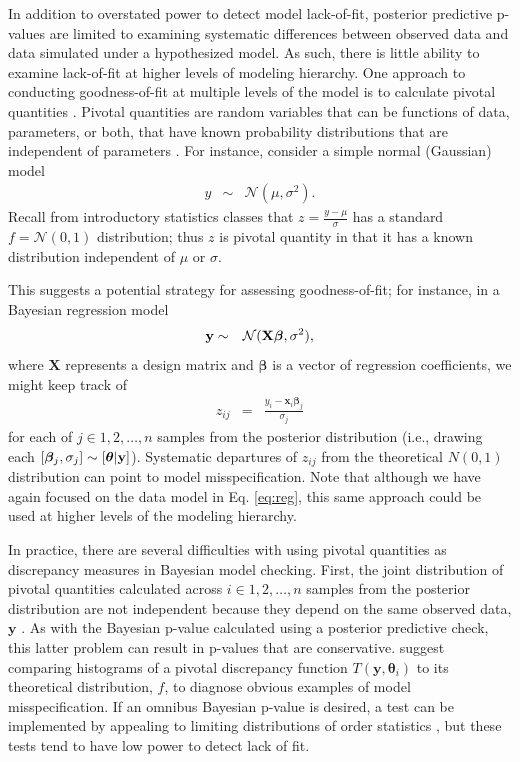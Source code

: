 \documentclass[12pt,english]{article}
\begin{document}
\begin{spacing}{1.9}
In addition to overstated power to detect model lack-of-fit, posterior predictive p-values are limited to examining systematic differences between observed data and data simulated under a hypothesized model.  As such, there is little ability to examine lack-of-fit at higher levels of modeling hierarchy.  One approach to conducting goodness-of-fit at multiple levels of the model is to calculate pivotal quantities \citep{Johnson2004,YuanJohnson2012}.  Pivotal quantities are random variables that can be functions of data, parameters, or both, that have known probability distributions that are independent of parameters \citep[see e.g.,][section 9.2.2]{CasellaBerger1990}.  For instance, consider a simple normal (Gaussian) model
\begin{eqnarray*}
  y & \sim & \mathcal{N}(\mu,\sigma^2).
\end{eqnarray*}
Recall from introductory statistics classes that $z = \frac{y-\mu}{\sigma}$ has a standard $f=\mathcal{N}(0,1)$ distribution; thus $z$ is pivotal quantity in that it has a known distribution independent of $\mu$ or $\sigma$.

This suggests a potential strategy for assessing goodness-of-fit; for instance, in a Bayesian regression model
\begin{eqnarray}
  \label{eq:reg}
  {\bf y} & \sim & \mathcal{N}(\textbf{X} \boldsymbol{\beta},\sigma^2),
\end{eqnarray}
where $\textbf{X}$ represents a design matrix and $\boldsymbol{\beta}$ is a vector of regression coefficients, we might keep track of
\begin{eqnarray}
  \label{eq:resid}
  z_{ij} & = & \frac{y_i - \textbf{x}_i \boldsymbol{\beta}_j}{\sigma_j}
\end{eqnarray}
for each of $j \in {1, 2, \hdots, n}$ samples from the posterior distribution (i.e., drawing each $[\boldsymbol{\beta}_j,\sigma_j] \sim [\boldsymbol{\theta}|{\bf y}]$).  Systematic departures of $z_{ij}$ from the theoretical $N(0,1)$ distribution can point to model misspecification.  Note that although we have again focused on the data model in Eq. \ref{eq:reg}, this same approach could be used at higher levels of the modeling hierarchy.

In practice, there are several difficulties with using pivotal quantities as discrepancy measures in Bayesian model checking.  First, the joint distribution of pivotal quantities calculated across $i \in 1,2,\hdots,n$ samples from the posterior distribution are not independent because they depend on the same observed data, $\textbf{y}$ \citep{Johnson2004}.  As with the Bayesian p-value calculated using a posterior predictive check, this latter problem can result in p-values that are conservative.  \citet{YuanJohnson2012} suggest comparing histograms of a pivotal discrepancy function $T(\textbf{y},\boldsymbol{\theta}_i)$ to its theoretical distribution, $f$, to diagnose obvious examples of model misspecification.  If an omnibus Bayesian p-value is desired, a test can be implemented by appealing to limiting distributions of order statistics \citep{Johnson2004}, but these tests tend to have low power to detect lack of fit.


\end{spacing}
\end{document}
